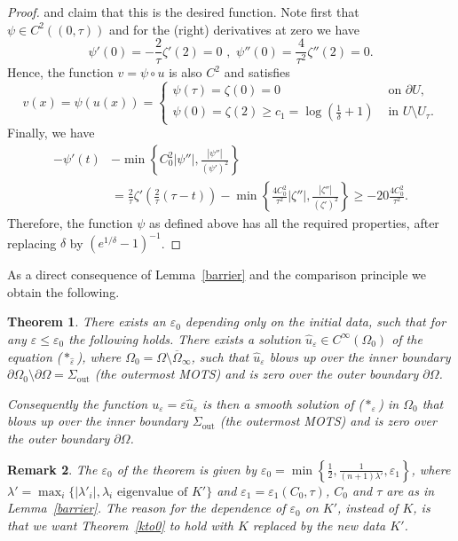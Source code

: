 \documentclass[11pt]{amsart}
\newtheorem{Theorem}{Theorem}
\newtheorem{Remark}[Theorem]{Remark}
\renewcommand{\epsilon}{\varepsilon}
\def\d{\delta}
\def\e{\epsilon}
\def\t{\tau}
\def\l{\lambda}
\def\ov{\overline}
\def\out{\text{out}}
\begin{document}
\begin{proof}
and claim that this is the desired function. Note first that 
 $\psi\in C^2((0,\tau))$  and for the (right) derivatives at zero we have
\[\psi'(0)=-\frac{2}{\t}\zeta'(2)=0\,\,,\,\,\psi''(0)=\frac{4}{\t^2}\zeta''(2)=0.\]
Hence, the function $v=\psi\circ u$ is also $C^2$ and satisfies
\[v(x)=\psi(u(x))=\begin{cases}\psi(\tau)=\zeta(0)=0&\text{ on  }\partial U,\\
\psi(0)=\zeta(2)\ge c_1=\log\left(\frac1\d+1\right) &\text{ in  } U\setminus U_\t.
\end{cases}\]
Finally, we have
\[\begin{split}-\psi'(t)&-\min\left\{C_0^2|\psi''|,\frac{|\psi''|}{(\psi')^2}\right\}\\
&=\frac{2}{\tau}\zeta'\left(\frac2\tau(\tau-t)\right)-\min\left\{\frac{4 C_0^2}{\tau ^2}|\zeta''|,\frac{|\zeta''|}{(\zeta')^2}\right\}
\ge -20\frac{4 C_0^2}{\tau^2}.
\end{split}\]
Therefore, the function $\psi$ as defined above has all the required properties, after replacing $\d$ by $(e^{1/\d}-1)^{-1}$.
\end{proof}









As a direct consequence of Lemma~\ref{barrier} and the comparison principle we obtain the following. 
\begin{Theorem}\label{blowup}
There exists an $\e_0$ depending only on the initial data, such that for any $\e\le \e_0$ the following holds. There exists a solution $\hat u_\e\in C^\infty(\Omega_0)$ of the equation ($*_{\hat\e}$), where  $\Omega_0=\Omega\setminus\ov\Omega_\infty$, such that $\hat u_\e$ blows up over the inner boundary $\partial\Omega_0\setminus\partial\Omega=\Sigma_\out$ (the outermost MOTS) and is  zero over the outer boundary $\partial \Omega$.

 Consequently the function $u_\e=\e\hat u_\e$ is then a smooth solution of ($*_{\e}$) in $\Omega_0$ that blows up over the inner boundary $\Sigma_\out$ (the outermost MOTS) and is  zero over the outer boundary $\partial \Omega$.
\end{Theorem}
\begin{Remark} The $\e_0$ of the theorem is given by $\e_0=\min\left\{\frac12, \frac{1}{(n+1)\l'}, \e_1\right\}$, where $\l'=\max_i\{|\l'_i|, \l_i\text{  eigenvalue of  } K'\}$ and $\e_1=\e_1(C_0,\t)$, $C_0$ and $\t$ are as in  Lemma~\ref{barrier}. The reason for the dependence of $\e_0$ on $K'$, instead of $K$, is that we want Theorem~\ref{kto0} to hold with $K$ replaced by the new data $K'$. 
\end{Remark}
\end{document}
